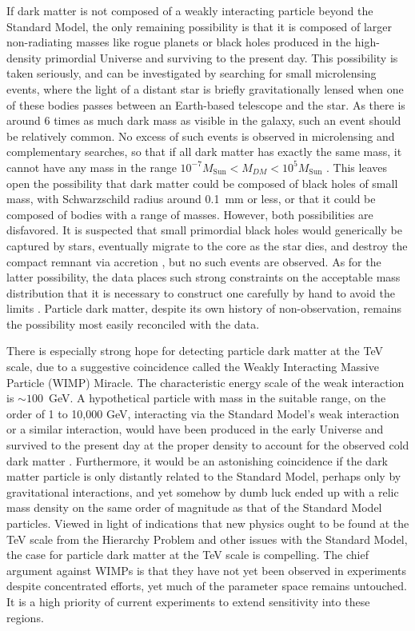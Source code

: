   If dark matter is not composed of a weakly interacting particle beyond the Standard Model, the only remaining possibility is that it is composed of larger non-radiating masses like rogue planets or black holes produced in the high-density primordial Universe and surviving to the present day.
  This possibility is taken seriously, and can be investigated by searching for small microlensing events, where the light of a distant star is briefly gravitationally lensed when one of these bodies passes between an Earth-based telescope and the star.
  As there is around 6 times as much dark mass as visible in the galaxy, such an event should be relatively common.
  No excess of such events is observed in microlensing and complementary searches, so that if all dark matter has exactly the same mass, it cannot have any mass in the range $10^{-7}M_{\mathrm{Sun}} < M_{DM} < 10^5 M_{\mathrm{Sun}}$ \cite{primordialBH_dist}.
  This leaves open the possibility that dark matter could be composed of black holes of small mass, with Schwarzschild radius around 0.1~mm or less, or that it could be composed of bodies with a range of masses.
  However, both possibilities are disfavored.
  It is suspected that small primordial black holes would generically be captured by stars, eventually migrate to the core as the star dies, and destroy the compact remnant via accretion \cite{primordialBH}, but no such events are observed.
  As for the latter possibility, the data places such strong constraints on the acceptable mass distribution that it is necessary to construct one carefully by hand to avoid the limits \cite{primordialBH_dist}.
  Particle dark matter, despite its own history of non-observation, remains the possibility most easily reconciled with the data.

  There is especially strong hope for detecting particle dark matter at the TeV scale, due to a suggestive coincidence called the Weakly Interacting Massive Particle (WIMP) Miracle.
  The characteristic energy scale of the weak interaction is $\sim100$~GeV.
  A hypothetical particle with mass in the suitable range, on the order of 1 to 10,000 GeV, interacting via the Standard Model's weak interaction or a similar interaction, would have been produced in the early Universe and survived to the present day at the proper density to account for the observed cold dark matter \cite{WIMPmiracle}.
  Furthermore, it would be an astonishing coincidence if the dark matter particle is only distantly related to the Standard Model, perhaps only by gravitational interactions, and yet somehow by dumb luck ended up with a relic mass density on the same order of magnitude as that of the Standard Model particles.
  Viewed in light of indications that new physics ought to be found at the TeV scale from the Hierarchy Problem and other issues with the Standard Model, the case for particle dark matter at the TeV scale is compelling.
  The chief argument against WIMPs is that they have not yet been observed in experiments despite concentrated efforts, yet much of the parameter space remains untouched.
  It is a high priority of current experiments to extend sensitivity into these regions.

